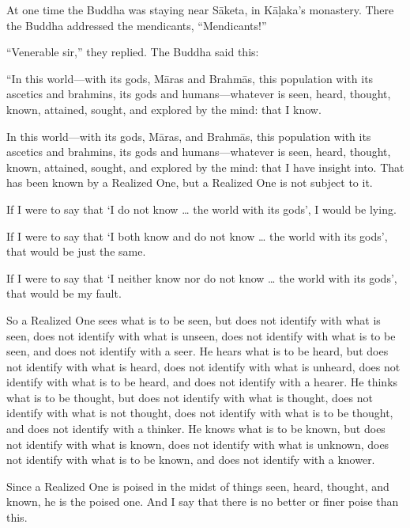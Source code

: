 \documentclass[12pt,openany]{book}%
\begin{document}
At one time the Buddha was staying near \textsanskrit{Sāketa}, in \textsanskrit{Kāḷaka}’s monastery. There the Buddha addressed the mendicants, “Mendicants!” 

“Venerable sir,” they replied. The Buddha said this: 

“In this world—with its gods, \textsanskrit{Māras} and \textsanskrit{Brahmās}, this population with its ascetics and brahmins, its gods and humans—whatever is seen, heard, thought, known, attained, sought, and explored by the mind: that I know. 

In this world—with its gods, \textsanskrit{Māras}, and \textsanskrit{Brahmās}, this population with its ascetics and brahmins, its gods and humans—whatever is seen, heard, thought, known, attained, sought, and explored by the mind: that I have insight into. That has been known by a Realized One, but a Realized One is not subject to it. 

If I were to say that ‘I do not know … the world with its gods’, I would be lying. 

If I were to say that ‘I both know and do not know … the world with its gods’, that would be just the same. 

If I were to say that ‘I neither know nor do not know … the world with its gods’, that would be my fault. 

So a Realized One sees what is to be seen, but does not identify with what is seen, does not identify with what is unseen, does not identify with what is to be seen, and does not identify with a seer. He hears what is to be heard, but does not identify with what is heard, does not identify with what is unheard, does not identify with what is to be heard, and does not identify with a hearer. He thinks what is to be thought, but does not identify with what is thought, does not identify with what is not thought, does not identify with what is to be thought, and does not identify with a thinker. He knows what is to be known, but does not identify with what is known, does not identify with what is unknown, does not identify with what is to be known, and does not identify with a knower. 

Since a Realized One is poised in the midst of things seen, heard, thought, and known, he is the poised one. And I say that there is no better or finer poise than this. 
\end{document}
